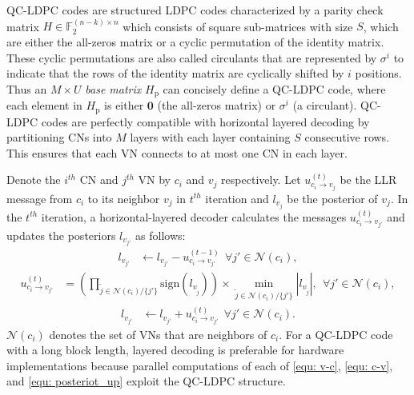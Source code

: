 \documentclass [PhD] {uclathes}
\begin{document}
QC-LDPC codes are structured LDPC codes characterized by a parity check matrix $H\in \mathbb{F}_2^{(n-k)\times n}$ which consists of square sub-matrices with size $S$, which are either the all-zeros matrix or a cyclic permutation of the identity matrix.   These cyclic permutations  are also called circulants that are represented by $\sigma^i$ to indicate that the rows of the identity matrix are  cyclically shifted  by $i$ positions.  Thus an $M\times U$ \emph{base matrix} $H_\text{p}$ can concisely define a QC-LDPC code, where each element in $H_\text{p}$ is either $\mathbf{0}$ (the all-zeros matrix) or $\sigma^i$ (a circulant). QC-LDPC codes are  perfectly compatible with horizontal layered decoding by partitioning CNs into $M$ layers with each layer containing $S$ consecutive rows. This ensures that each VN connects to at most one CN in each layer.

Denote the $i^{th}$ CN and $j^{th}$ VN by $c_i$ and $v_j$ respectively. Let $u^{(t)}_{c_i\rightarrow v_j}$ be the LLR message from $c_i$ to its neighbor $v_j$ in $t^{th}$ iteration and $l_{v_j}$ be the posterior of $v_j$.  In the $t^{th}$ iteration, a  horizontal-layered \minsum decoder calculates the messages $u^{(t)}_{c_i\rightarrow v_{j'}}$ and updates the posteriors $l_{v_{j'}}$ as follows:
\begin{align}
    {l}_{v_{j'}} &\leftarrow  l_{v_{j'}}- u^{(t-1)}_{c_i\rightarrow v_{j'}}~~\forall j'\in\mathcal{N}(c_i),\label{equ: v-c}
\end{align}
\begin{align}
        u^{(t)}_{c_i\rightarrow v_{j'}} &=
    \left(\prod_{\tilde{j}\in\mathcal{N}(c_i)/\{{j'}\}}\text{sign}(l_{v_{\tilde{j}}})\right)\times\min_{\tilde{j}\in\mathcal{N}(c_i)/\{{j'}\}}|l_{v_{\tilde{j}}}|,~~\forall j'\in\mathcal{N}(c_i), \label{equ: c-v}
\end{align}
\begin{align}
    l_{v_{j'}} &\leftarrow {l}_{v_{j'}}+u^{(t)}_{c_i \rightarrow v_{j'}} ~~\forall j'\in\mathcal{N}(c_i)\label{equ: posteriot_up}.
\end{align}
$\mathcal{N}(c_i)$ denotes the set of VNs that are neighbors of $c_i$.  For a QC-LDPC code with a long block length, layered decoding is preferable for hardware implementations because  parallel computations of each of \eqref{equ: v-c}, \eqref{equ: c-v}, and \eqref{equ: posteriot_up} exploit the QC-LDPC structure. 
\end{document}
